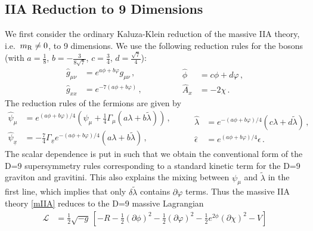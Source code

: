 \documentclass[12pt,a4paper]{article}
\begin{document}
\subsection{IIA Reduction to 9 Dimensions}



We first consider the ordinary Kaluza-Klein reduction of
the massive IIA theory, i.e.~$m_{\rm R}\ne 0$, to 9 dimensions.
We use the following reduction rules for the bosons
(with $a=\tfrac{1}{8}$,
$b=-\tfrac{3}{8 \sqrt{7}}$, $c=\tfrac{3}{4}$, $d=\tfrac{\sqrt{7}}{4}$):
\begin{equation}
\begin{aligned}
  \hat{g}_{\mu\nu} & = e^{a \phi + b \varphi} g_{\mu\nu}\, , \\
  \hat{g}_{xx} & = e^{-7(a \phi + b \varphi)}\, , \qquad
\end{aligned} \qquad
\begin{aligned}
  \hat{\phi} & = c \phi + d \varphi\, ,  \\
  \hat{A}_x & = -2 \chi \,.
\end{aligned}
\end{equation}
The reduction rules of the fermions are given by
\begin{equation}
\begin{aligned}
  \hat{\psi}_\mu & = e^{(a\phi+b\varphi)/4}
    (\psi_\mu + \tfrac{1}{4} \Gamma_{\mu} (a \lambda + b \tilde{\lambda})) \,, \\
  \hat{\psi}_{\underline{x}} & = - \tfrac{7}{4} \Gamma_{\underline{x}}
    e^{-(a\phi+b\varphi)/4} (a \lambda + b \tilde{\lambda}) \,, \qquad
\end{aligned} \qquad
\begin{aligned}
  \hat{\lambda} & = e^{-(a\phi+b\varphi)/4} (c \lambda + d \tilde{\lambda})\,, \\
  \hat{\epsilon} & = e^{(a\phi+b\varphi)/4} \epsilon \,.
\end{aligned}
\label{redfermIIA}
\end{equation}
The scalar dependence is put in such that we obtain the
conventional form of the D=9 supersymmetry rules corresponding to
a standard kinetic term for the D=9 graviton and gravitini. This
also explains the mixing between $\psi_\mu$ and $\tilde{\lambda}$
in the first line, which implies that only $\delta
\tilde{\lambda}$ contains $\partial \varphi$ terms. Thus the
massive IIA theory \eqref{mIIA} reduces to the D=9 massive
Lagrangian
\begin{align}
  \mathcal{L}
  & = \tfrac{1}{2} \sqrt{-{g}} \,
    [ -{R} - \tfrac{1}{2} (\partial \phi)^2 - \tfrac{1}{2} (\partial \varphi)^2
    - \tfrac{1}{2} e^{2 \phi} (\partial \chi)^2
    - V]
\end{align}
\end{document}
